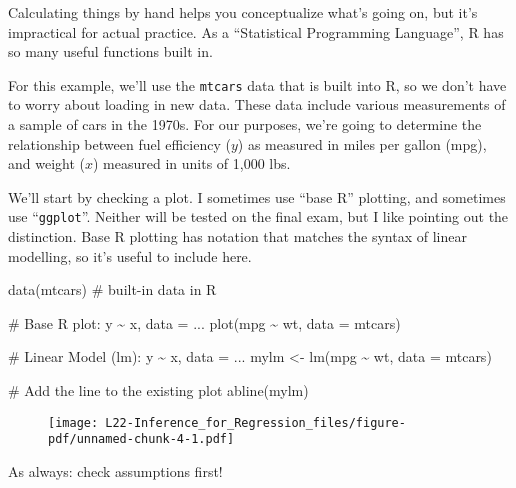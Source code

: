 \documentclass[
  letterpaper,
  DIV=11,
  numbers=noendperiod]{scrreprt}
\newenvironment{Shaded}{\begin{snugshade}}{\end{snugshade}}
\newcommand{\AttributeTok}[1]{\textcolor[rgb]{0.40,0.45,0.13}{#1}}
\newcommand{\CommentTok}[1]{\textcolor[rgb]{0.37,0.37,0.37}{#1}}
\newcommand{\FunctionTok}[1]{\textcolor[rgb]{0.28,0.35,0.67}{#1}}
\newcommand{\NormalTok}[1]{\textcolor[rgb]{0.00,0.23,0.31}{#1}}
\newcommand{\OtherTok}[1]{\textcolor[rgb]{0.00,0.23,0.31}{#1}}
\newcommand{\SpecialCharTok}[1]{\textcolor[rgb]{0.37,0.37,0.37}{#1}}
\begin{document}
Calculating things by hand helps you conceptualize what's going on, but
it's impractical for actual practice. As a ``Statistical Programming
Language'', R has so many useful functions built in.

For this example, we'll use the \texttt{mtcars} data that is built into
R, so we don't have to worry about loading in new data. These data
include various measurements of a sample of cars in the 1970s. For our
purposes, we're going to determine the relationship between fuel
efficiency (\(y\)) as measured in miles per gallon (mpg), and weight
(\(x\)) measured in units of 1,000 lbs.

We'll start by checking a plot. I sometimes use ``base R'' plotting, and
sometimes use ``\texttt{ggplot}''. Neither will be tested on the final
exam, but I like pointing out the distinction. Base R plotting has
notation that matches the syntax of linear modelling, so it's useful to
include here.

\begin{Shaded}
\begin{Highlighting}[]
\FunctionTok{data}\NormalTok{(mtcars) }\CommentTok{\# built{-}in data in R}

\CommentTok{\# Base R plot: y \textasciitilde{} x, data = ...}
\FunctionTok{plot}\NormalTok{(mpg }\SpecialCharTok{\textasciitilde{}}\NormalTok{ wt, }\AttributeTok{data =}\NormalTok{ mtcars)}

\CommentTok{\# Linear Model (lm): y \textasciitilde{} x, data = ...}
\NormalTok{mylm }\OtherTok{\textless{}{-}} \FunctionTok{lm}\NormalTok{(mpg }\SpecialCharTok{\textasciitilde{}}\NormalTok{ wt, }\AttributeTok{data =}\NormalTok{ mtcars)}

\CommentTok{\# Add the line to the existing plot}
\FunctionTok{abline}\NormalTok{(mylm)}
\end{Highlighting}
\end{Shaded}

\begin{figure}[H]

{\centering \texttt{[image: L22-Inference\_for\_Regression\_files/figure-pdf/unnamed-chunk-4-1.pdf]}

}

\end{figure}

As always: check assumptions first!
\end{document}
